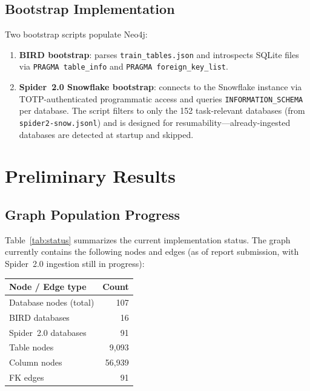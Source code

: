 \documentclass[11pt]{article}
\begin{document}
\subsection{Bootstrap Implementation}

Two bootstrap scripts populate Neo4j:

\begin{enumerate}[leftmargin=*]
  \item \textbf{BIRD bootstrap}: parses \texttt{train\_tables.json} and introspects SQLite files via \texttt{PRAGMA table\_info} and \texttt{PRAGMA foreign\_key\_list}.
  \item \textbf{Spider~2.0 Snowflake bootstrap}: connects to the Snowflake instance via TOTP-authenticated programmatic access and queries \texttt{INFORMATION\_SCHEMA} per database. The script filters to only the 152 task-relevant databases (from \texttt{spider2-snow.jsonl}) and is designed for resumability---already-ingested databases are detected at startup and skipped.
\end{enumerate}

\section{Preliminary Results}

\subsection{Graph Population Progress}

Table~\ref{tab:status} summarizes the current implementation status.
The graph currently contains the following nodes and edges (as of report submission, with Spider~2.0 ingestion still in progress):

\begin{center}
\begin{tabular}{lr}
\toprule
\textbf{Node / Edge type} & \textbf{Count} \\
\midrule
Database nodes (total) & 107 \\
\quad BIRD databases & 16 \\
\quad Spider~2.0 databases & 91 \\
Table nodes & 9{,}093 \\
Column nodes & 56{,}939 \\
FK edges & 91 \\
\bottomrule
\end{tabular}
\end{center}
\end{document}
